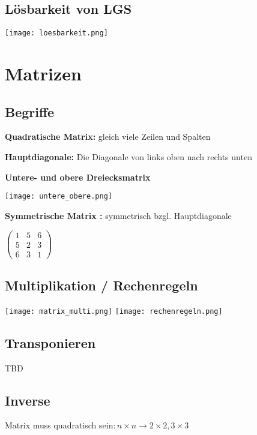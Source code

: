 \begin{multicols*}{3}
    \subsection{Lösbarkeit von LGS}

    \texttt{[image: loesbarkeit.png]}

    \section{Matrizen}
    \subsection{Begriffe}

    \textbf{Quadratische Matrix:} gleich viele Zeilen und Spalten

    \textbf{Hauptdiagonale:} Die Diagonale von links oben nach rechts unten

    \textbf{Untere- und obere Dreiecksmatrix}

    \texttt{[image: untere\_obere.png]}

    \textbf{Symmetrische Matrix :} symmetrisch bzgl. Hauptdiagonale

    $ \begin{pmatrix}
            1 & 5 & 6 \\
            5 & 2 & 3 \\
            6 & 3 & 1
        \end{pmatrix} $

    \WhiteSpace
    \subsection{Multiplikation / Rechenregeln}
    {\begin{multicols}{2}
            { \texttt{[image: matrix\_multi.png]} }
            \columnbreak
            { \texttt{[image: rechenregeln.png]} }
        \end{multicols}}

    \subsection{Transponieren}

    TBD

    \subsection{Inverse}
    {Matrix muss quadratisch sein$: n \times n \rightarrow 2\times2, 3\times3$}


\end{multicols*}
